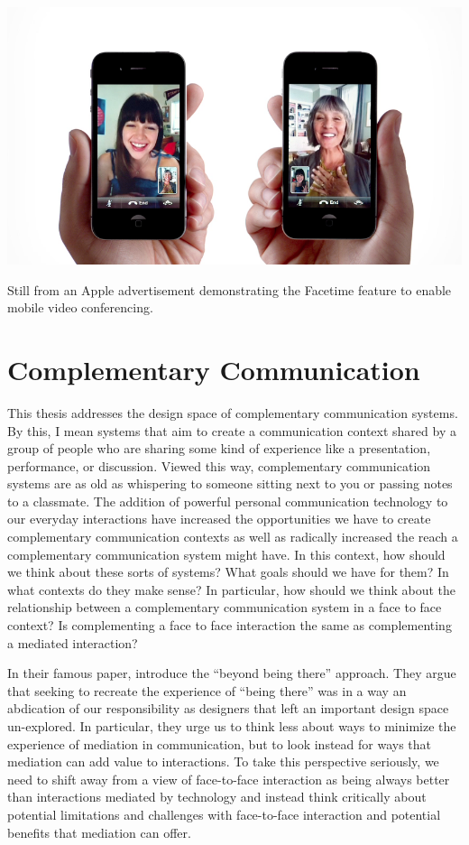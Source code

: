 \begin{marginfigure}
	\includegraphics{figures/iphone-face-to-face.png}
	\caption{Still from an Apple advertisement demonstrating the Facetime feature to enable mobile video conferencing.}
	\label{fig:facetime}
\end{marginfigure}




\section{Complementary Communication}
This thesis addresses the design space of complementary communication systems. By this, I mean systems that aim to create a communication context shared by a group of people who are sharing some kind of experience like a presentation, performance, or discussion. Viewed this way, complementary communication systems are as old as whispering to someone sitting next to you or passing notes to a classmate. The addition of powerful personal communication technology to our everyday interactions have increased the opportunities we have to create complementary communication contexts as well as radically increased the reach a complementary communication system might have. In this context, how should we think about these sorts of systems? What goals should we have for them? In what contexts do they make sense? In particular, how should we think about the relationship between a complementary communication system in a face to face context? Is complementing a face to face interaction the same as complementing a mediated interaction?


In their famous paper, \citet{Hollan:1992tz} introduce the ``beyond being there'' approach. They argue that seeking to recreate the experience of ``being there'' was in a way an abdication of our responsibility as designers that left an important design space un-explored. In particular, they urge us to think less about ways to minimize the experience of mediation in communication, but to look instead for ways that mediation can add value to interactions. To take this perspective seriously, we need to shift away from a view of face-to-face interaction as being always better than interactions mediated by technology and instead think critically about potential limitations and challenges with face-to-face interaction and potential benefits that mediation can offer. 

